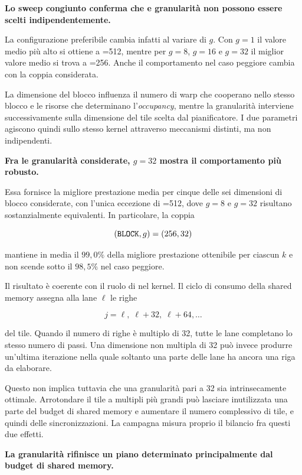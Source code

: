 \textbf{Lo sweep congiunto conferma che  e granularità non possono
essere scelti indipendentemente.}

La configurazione preferibile cambia infatti al variare di $g$. Con
$g=1$ il valore medio più alto si ottiene a =512, mentre per
$g=8$, $g=16$ e $g=32$ il miglior valore medio si trova a
=256. Anche il comportamento nel caso peggiore cambia con la
coppia considerata.

La dimensione del blocco influenza il numero di warp che cooperano nello
stesso blocco e le risorse che determinano l'\emph{occupancy}, mentre la granularità
interviene successivamente sulla dimensione del tile scelta dal
pianificatore. I due parametri agiscono quindi sullo stesso kernel attraverso
meccanismi distinti, ma non indipendenti.

\textbf{Fra le granularità considerate, $g=32$ mostra il comportamento più
robusto.}

Essa fornisce la migliore prestazione media per cinque delle sei dimensioni
di blocco considerate, con l'unica eccezione di =512, dove
$g=8$ e $g=32$ risultano sostanzialmente equivalenti. In particolare, la
coppia

\[
(\texttt{BLOCK},g)=(256,32)
\]

mantiene in media il $99{,}0\%$ della migliore prestazione ottenibile per
ciascun $k$ e non scende sotto il $98{,}5\%$ nel caso peggiore.

Il risultato è coerente con il ruolo di  nel kernel.
Il ciclo di consumo della shared memory assegna alla lane $\ell$ le righe

\[
j=\ell,\;\ell+32,\;\ell+64,\ldots
\]

del tile. Quando il numero di righe è multiplo di 32, tutte le lane
completano lo stesso numero di passi. Una dimensione non multipla di 32 può
invece produrre un'ultima iterazione nella quale soltanto una parte delle
lane ha ancora una riga da elaborare.

Questo non implica tuttavia che una granularità pari a 32 sia
intrinsecamente ottimale. Arrotondare il tile a multipli più grandi può
lasciare inutilizzata una parte del budget di shared memory e aumentare il
numero complessivo di tile, e quindi delle sincronizzazioni. La campagna
misura proprio il bilancio fra questi due effetti.

\textbf{La granularità rifinisce un piano determinato principalmente dal
budget di shared memory.}

